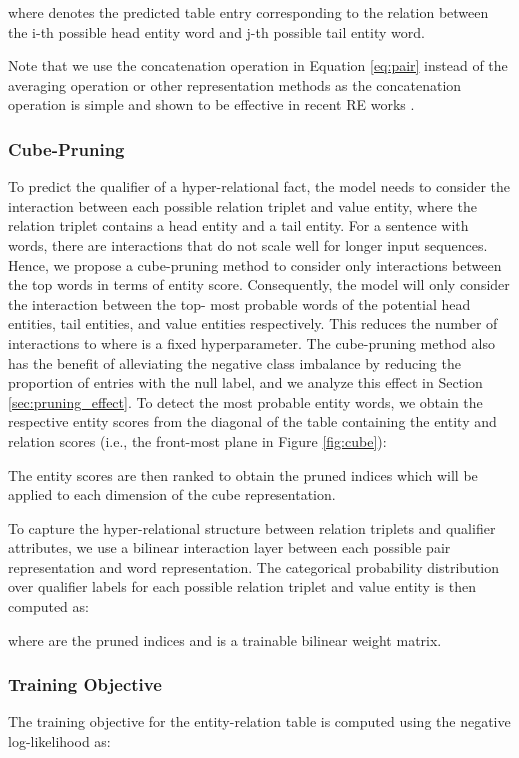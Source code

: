 \documentclass[11pt]{article}
\newcommand{\flag}[1]{#1}
\begin{document}
where  denotes the predicted table entry corresponding to the relation between the i-th possible head entity word and j-th possible tail entity word.
\flag{
Note that we use the concatenation operation in Equation \ref{eq:pair} instead of the averaging operation or other representation methods \citep{baldini-soares-etal-2019-matching} as the concatenation operation is simple and shown to be effective in recent RE works \citep{wang-etal-2021-unire, wang-lu-2020-two}.
}
\subsubsection{Cube-Pruning}
\label{sec:pruning}
To predict the qualifier of a hyper-relational fact, the model needs to consider the interaction between each possible relation triplet and value entity, where the relation triplet contains a head entity and a tail entity.
For a sentence with  words, there are  interactions that do not scale well for longer input sequences. 
Hence, we propose a cube-pruning method to consider only interactions between the top  words in terms of entity score.
Consequently, the model will only consider the interaction between the top- most probable words of the potential head entities, tail entities, and value entities respectively.
This reduces the number of interactions to  where  is a fixed hyperparameter.
The cube-pruning method also has the benefit of alleviating the negative class imbalance by reducing the proportion of entries with the null label, and we analyze this effect in Section \ref{sec:pruning_effect}.
To detect the most probable entity words, we obtain the respective entity scores from the diagonal of the table  containing the entity and relation scores (i.e., the front-most plane in Figure \ref{fig:cube}):

The entity scores are then ranked to obtain the pruned indices  which will be applied to each dimension of the cube representation. 


To capture the hyper-relational structure between relation triplets and qualifier attributes, we use a bilinear interaction layer between each possible pair representation and word representation.
The categorical probability distribution over qualifier labels for each possible relation triplet and value entity is then computed as:

where  are the pruned indices and  is a trainable bilinear weight matrix.

\subsubsection{Training Objective}
The training objective for the entity-relation table is computed using the negative log-likelihood as:
\end{document}
